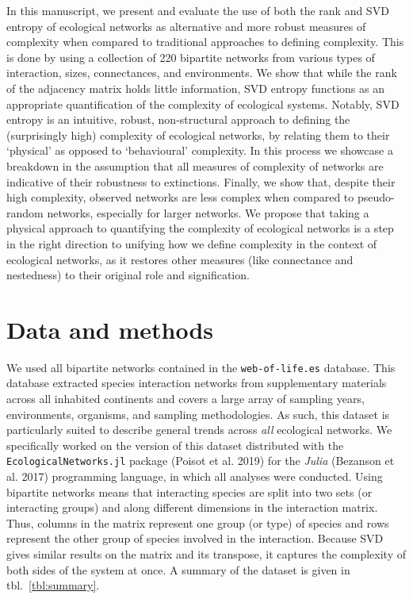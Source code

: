 \documentclass[11pt]{article}
\begin{document}
In this manuscript, we present and evaluate the use of both the rank and
SVD entropy of ecological networks as alternative and more robust
measures of complexity when compared to traditional approaches to
defining complexity. This is done by using a collection of 220 bipartite
networks from various types of interaction, sizes, connectances, and
environments. We show that while the rank of the adjacency matrix holds
little information, SVD entropy functions as an appropriate
quantification of the complexity of ecological systems. Notably, SVD
entropy is an intuitive, robust, non-structural approach to defining the
(surprisingly high) complexity of ecological networks, by relating them
to their `physical' as opposed to `behavioural' complexity. In this
process we showcase a breakdown in the assumption that all measures of
complexity of networks are indicative of their robustness to
extinctions. Finally, we show that, despite their high complexity,
observed networks are less complex when compared to pseudo-random
networks, especially for larger networks. We propose that taking a
physical approach to quantifying the complexity of ecological networks
is a step in the right direction to unifying how we define complexity in
the context of ecological networks, as it restores other measures (like
connectance and nestedness) to their original role and signification.

\hypertarget{data-and-methods}{%
\section{Data and methods}\label{data-and-methods}}

We used all bipartite networks contained in the \texttt{web-of-life.es}
database. This database extracted species interaction networks from
supplementary materials across all inhabited continents and covers a
large array of sampling years, environments, organisms, and sampling
methodologies. As such, this dataset is particularly suited to describe
general trends across \emph{all} ecological networks. We specifically
worked on the version of this dataset distributed with the
\texttt{EcologicalNetworks.jl} package (Poisot et al. 2019) for the
\emph{Julia} (Bezanson et al. 2017) programming language, in which all
analyses were conducted. Using bipartite networks means that interacting
species are split into two sets (or interacting groups) and along
different dimensions in the interaction matrix. Thus, columns in the
matrix represent one group (or type) of species and rows represent the
other group of species involved in the interaction. Because SVD gives
similar results on the matrix and its transpose, it captures the
complexity of both sides of the system at once. A summary of the dataset
is given in tbl.~\ref{tbl:summary}.
\end{document}
